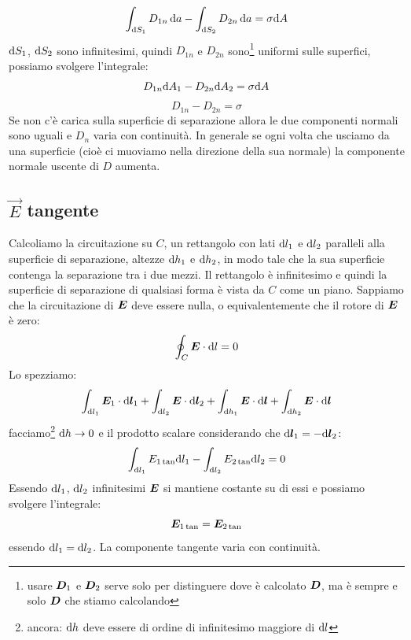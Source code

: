 \begin{equation}
  \int_{\mathrm{d} S_1} D_{1n}\,\mathrm{d} a-\int_{\mathrm{d} S_2}D_{2n}\,\mathrm{d} a=\sigma\mathrm{d} A
\end{equation}
$\mathrm{d} S_1$, $\mathrm{d} S_2$ sono infinitesimi, quindi $D_{1n}$ e $D_{2n}$ sono\footnote{usare $\boldsymbol{D}_1$ e $\boldsymbol{D}_2$ serve solo per distinguere dove è calcolato $\boldsymbol{D}$, ma è sempre e solo $\boldsymbol{D}$ che stiamo calcolando} uniformi sulle superfici, possiamo svolgere l'integrale:
\begin{equation}
  D_{1n}\mathrm{d} A_1-D_{2n}\mathrm{d} A_2=\sigma\mathrm{d} A
\end{equation}
\begin{equation}
  D_{1n}-D_{2n}=\sigma
  \label{D_normale02}
\end{equation}
Se non c'è carica sulla superficie di separazione allora le due componenti normali sono uguali e $D_n$ varia con continuità. In generale se ogni volta che usciamo da una superficie (cioè ci muoviamo nella direzione della sua normale) la componente normale uscente di $D$ aumenta.
\subsection{\texorpdfstring{$\vec E$}{E} tangente}
\begin{figure}[htbp]
  \centering
  
\end{figure}
Calcoliamo la circuitazione su $C$, un rettangolo con lati $\mathrm{d} l_1$ e $\mathrm{d} l_2$ paralleli alla superficie di separazione, altezze $\mathrm{d} h_1$ e $\mathrm{d} h_2$, in modo tale che la sua superficie contenga la separazione tra i due mezzi. Il rettangolo è infinitesimo e quindi la superficie di separazione di qualsiasi forma è vista da $C$ come un piano. Sappiamo che la circuitazione di $\boldsymbol{E}$ deve essere nulla, o equivalentemente che il rotore di $\boldsymbol{E}$ è zero:
\begin{equation}
  \oint_C\boldsymbol{E}\cdot \mathrm{d} l=0
\end{equation}
Lo spezziamo:
\begin{equation}
  \int_{\mathrm{d} l_1}\boldsymbol{E}_1\cdot\mathrm{d}\boldsymbol{l}_1+\int_{\mathrm{d} l_2}\boldsymbol{E}\cdot\mathrm{d}\boldsymbol{l}_2+\int_{\mathrm{d} h_1}\boldsymbol{E}\cdot\mathrm{d}\boldsymbol{l}+\int_{\mathrm{d} h_2}\boldsymbol{E}\cdot\mathrm{d}\boldsymbol{l}
\end{equation}
facciamo\footnote{ancora: $\mathrm{d} h$ deve essere di ordine di infinitesimo maggiore di $\mathrm{d} l$} $\mathrm{d} h\to 0$ e il prodotto scalare considerando che $\mathrm{d}\boldsymbol{l}_1=-\mathrm{d}\boldsymbol{l}_2$:
\begin{equation}
  \int_{\mathrm{d} l_1}E_{1\tan}\mathrm{d} l_1-\int_{\mathrm{d} l_2}E_{2\tan}\mathrm{d} l_2=0
\end{equation}
Essendo $\mathrm{d} l_1$, $\mathrm{d} l_2$ infinitesimi $\boldsymbol{E}$ si mantiene costante su di essi e possiamo svolgere l'integrale:
\begin{equation}
  \boldsymbol{E}_{1\tan}=\boldsymbol{E}_{2\tan}
\end{equation}
essendo $\mathrm{d} l_1=\mathrm{d} l_2$. La componente tangente varia con continuità.

